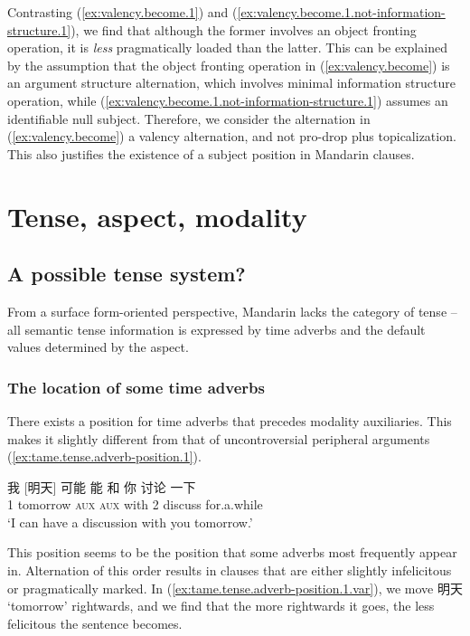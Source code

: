 \documentclass[UTF8, a4paper, oneside, scheme=plain, 12pt]{ctexrep}
\newcommand{\translate}[1]{`#1'}
\newcommand*{\category}[1]{\textsc{#1}}
\begin{document}
Contrasting (\ref{ex:valency.become.1})
and (\ref{ex:valency.become.1.not-information-structure.1}),
we find that although the former involves an object fronting operation,
it is \emph{less} pragmatically loaded than the latter.
This can be explained by the assumption that 
the object fronting operation in (\ref{ex:valency.become})
is an argument structure alternation,
which involves minimal information structure operation,
while (\ref{ex:valency.become.1.not-information-structure.1})
assumes an identifiable null subject.
Therefore, we consider the alternation in (\ref{ex:valency.become})
a valency alternation, and not pro-drop plus topicalization.
This also justifies the existence of a subject position in Mandarin clauses.


\chapter{Tense, aspect, modality}

\section{A possible tense system?}\label{sec:tam.tense}

From a surface form-oriented perspective, 
Mandarin lacks the category of tense -- 
all semantic tense information is 
expressed by time adverbs 
and the default values determined by the aspect.

\subsection{The location of some time adverbs}

There exists a position for time adverbs that precedes modality auxiliaries.
This makes it slightly different from that 
of uncontroversial peripheral arguments
(\ref{ex:tame.tense.adverb-position.1}).

\begin{exe}
    \ex\label{ex:tame.tense.adverb-position.1}
    \gll 我 [明天] 可能 能 和 你 讨论 一下 \\
    1 tomorrow \category{aux} \category{aux} with 2 discuss for.a.while \\
    \glt\translate{I can have a discussion with you tomorrow.}
\end{exe}

This position seems to be the position that some adverbs most frequently appear in.
Alternation of this order results in 
clauses that are either slightly infelicitous 
or pragmatically marked. 
In (\ref{ex:tame.tense.adverb-position.1.var}),
we move 明天 \translate{tomorrow} rightwards,
and we find that the more rightwards it goes,
the less felicitous the sentence becomes.
\end{document}
